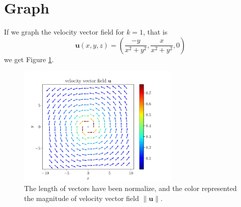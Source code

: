 \documentclass[12pt]{article}
\begin{document}
\noindent{}

\newpage

\section{Graph}
If we graph the velocity vector field for $k=1$, that is 
\begin{equation*}
\textbf{u}\left(x,y,z\right) = \left( \frac{-y}{x^2+y^2}, \frac{x}{x^2+y^2}, 0\right)
\end{equation*}
we get Figure \ref{fig:vec}.

\begin{figure}[h]
\centering
\includegraphics[width=0.69\textwidth]{img/vortex-fluid.pdf}
\caption{The length of vectors have been normalize, and the color represented the magnitude of velocity vector field $\lVert \textbf{u} \rVert$.}\label{fig:vec}
\end{figure}
\end{document}
